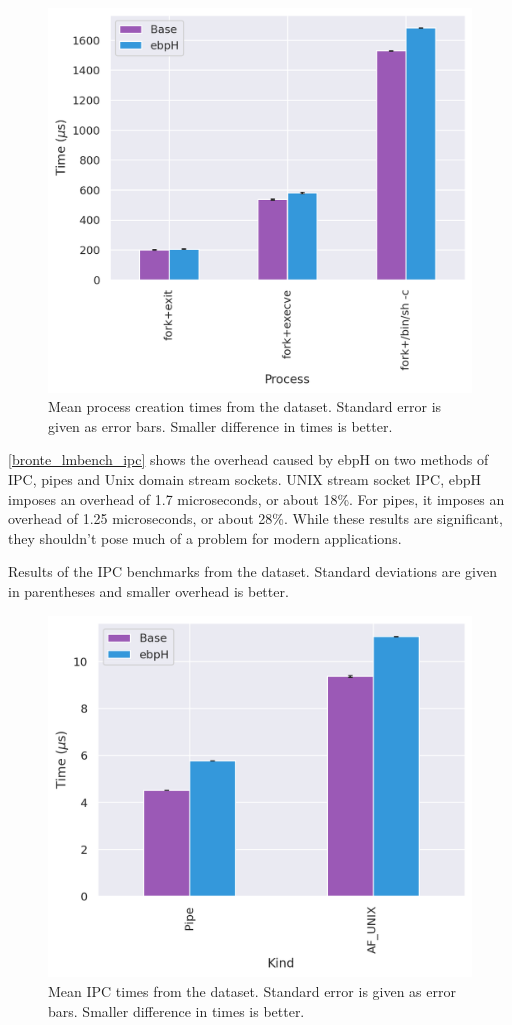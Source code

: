 \documentclass[
  12pt]{findlay}
\begin{document}
\begin{figure}
    \caption[Mean process creation times from the  dataset]{
        Mean process creation times from the  dataset.
        Standard error is given as error bars.
        Smaller difference in times is better.
    }
    \label{bronte_lmbench_process_graph}
    \includegraphics[width=.6\textwidth]{../data/bench/bronte-lmbench/process_times.png}
\end{figure}

\clearpage

\autoref{bronte_lmbench_ipc} shows the overhead caused by ebpH on two
methods of IPC, pipes and Unix domain stream sockets. UNIX stream socket
IPC, ebpH imposes an overhead of 1.7 microseconds, or about 18\%. For
pipes, it imposes an overhead of 1.25 microseconds, or about 28\%. While
these results are significant, they shouldn't pose much of a problem for
modern applications.

\begin{table}
    \caption[Results of the IPC benchmarks from the  dataset]{
        Results of the IPC benchmarks from the  dataset.
        Standard deviations are given in parentheses and smaller overhead is better.
    }
    \label{bronte_lmbench_ipc}
    
\end{table}

\begin{figure}
    \caption[Mean IPC times from the  dataset]{
        Mean IPC times from the  dataset.
        Standard error is given as error bars.
        Smaller difference in times is better.
    }
    \label{bronte_lmbench_ipc_graph}
    \includegraphics[width=.6\textwidth]{../data/bench/bronte-lmbench/ipc_times.png}
\end{figure}
\end{document}
